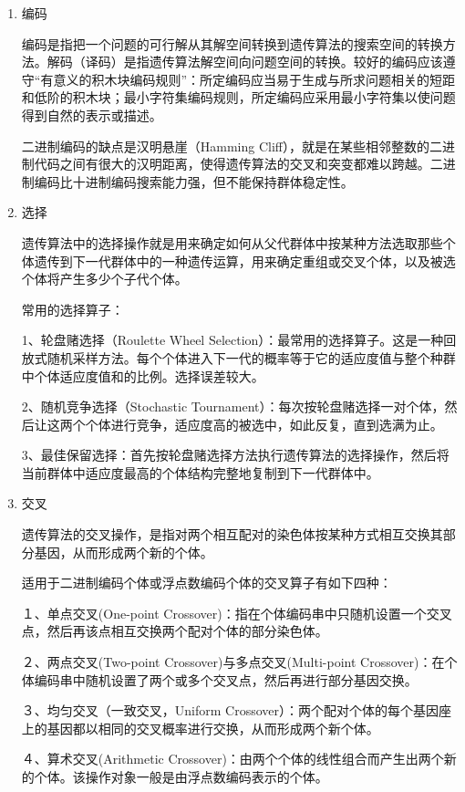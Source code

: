 \documentclass[10.5pt,twocolumn]{jbuaa}
\begin{document}
\begin{enumerate}[label = (\roman*)]

\item \hei 编码
\normalfont

编码是指把一个问题的可行解从其解空间转换到遗传算法的搜索空间的转换方法。解码（译码）是指遗传算法解空间向问题空间的转换。较好的编码应该遵守“有意义的积木块编码规则”：所定编码应当易于生成与所求问题相关的短距和低阶的积木块；最小字符集编码规则，所定编码应采用最小字符集以使问题得到自然的表示或描述。

二进制编码的缺点是汉明悬崖（Hamming Cliff），就是在某些相邻整数的二进制代码之间有很大的汉明距离，使得遗传算法的交叉和突变都难以跨越。二进制编码比十进制编码搜索能力强，但不能保持群体稳定性。
\item \hei 选择
\normalfont

遗传算法中的选择操作就是用来确定如何从父代群体中按某种方法选取那些个体遗传到下一代群体中的一种遗传运算，用来确定重组或交叉个体，以及被选个体将产生多少个子代个体。

常用的选择算子：

1、轮盘赌选择（Roulette Wheel Selection）：最常用的选择算子。这是一种回放式随机采样方法。每个个体进入下一代的概率等于它的适应度值与整个种群中个体适应度值和的比例。选择误差较大。

2、随机竞争选择（Stochastic Tournament）：每次按轮盘赌选择一对个体，然后让这两个个体进行竞争，适应度高的被选中，如此反复，直到选满为止。

3、最佳保留选择：首先按轮盘赌选择方法执行遗传算法的选择操作，然后将当前群体中适应度最高的个体结构完整地复制到下一代群体中。
\item \hei 交叉
\normalfont

遗传算法的交叉操作，是指对两个相互配对的染色体按某种方式相互交换其部分基因，从而形成两个新的个体。

适用于二进制编码个体或浮点数编码个体的交叉算子有如下四种：

１、单点交叉(One-point Crossover)：指在个体编码串中只随机设置一个交叉点，然后再该点相互交换两个配对个体的部分染色体。

２、两点交叉(Two-point Crossover)与多点交叉(Multi-point Crossover)：在个体编码串中随机设置了两个或多个交叉点，然后再进行部分基因交换。

３、均匀交叉（一致交叉，Uniform Crossover）：两个配对个体的每个基因座上的基因都以相同的交叉概率进行交换，从而形成两个新个体。

４、算术交叉(Arithmetic Crossover)：由两个个体的线性组合而产生出两个新的个体。该操作对象一般是由浮点数编码表示的个体。


\end{enumerate}
\end{document}
